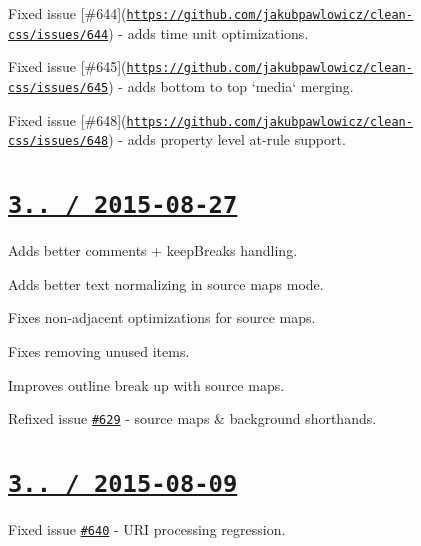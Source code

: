 \begin{DoxyItemize}
\item Fixed issue \mbox{[}\#644\mbox{]}(\href{https://github.com/jakubpawlowicz/clean-css/issues/644}{\tt https\+://github.\+com/jakubpawlowicz/clean-\/css/issues/644}) -\/ adds time unit optimizations.
\item Fixed issue \mbox{[}\#645\mbox{]}(\href{https://github.com/jakubpawlowicz/clean-css/issues/645}{\tt https\+://github.\+com/jakubpawlowicz/clean-\/css/issues/645}) -\/ adds bottom to top `media` merging.
\item Fixed issue \mbox{[}\#648\mbox{]}(\href{https://github.com/jakubpawlowicz/clean-css/issues/648}{\tt https\+://github.\+com/jakubpawlowicz/clean-\/css/issues/648}) -\/ adds property level at-\/rule support.
\end{DoxyItemize}

\section*{\href{https://github.com/jakubpawlowicz/clean-css/compare/v3.3.9...v3.3.10}{\tt 3.. / 2015-\/08-\/27} }


\begin{DoxyItemize}
\item Adds better comments + keep\+Breaks handling.
\item Adds better text normalizing in source maps mode.
\item Fixes non-\/adjacent optimizations for source maps.
\item Fixes removing unused items.
\item Improves {\ttfamily outline} break up with source maps.
\item Refixed issue \href{https://github.com/jakubpawlowicz/clean-css/issues/629}{\tt \#629} -\/ source maps \& background shorthands.
\end{DoxyItemize}

\section*{\href{https://github.com/jakubpawlowicz/clean-css/compare/v3.3.8...v3.3.9}{\tt 3.. / 2015-\/08-\/09} }


\begin{DoxyItemize}
\item Fixed issue \href{https://github.com/jakubpawlowicz/clean-css/issues/640}{\tt \#640} -\/ U\+RI processing regression.
\end{DoxyItemize}

